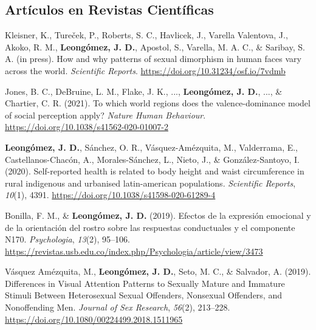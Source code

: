 \documentclass[11pt, a4paper]{awesome-cv}
\begin{document}
\endgroup

\hypertarget{artuxedculos-en-revistas-cientuxedficas}{%
\subsection{Artículos en Revistas
Científicas}\label{artuxedculos-en-revistas-cientuxedficas}}

\begingroup
\setlength{\parindent}{-0.5in}
\setlength{\leftskip}{0.5in}

\hypertarget{refs_journals}{}
\leavevmode\hypertarget{ref-Kleisner2021}{}%
Kleisner, K., Tureček, P., Roberts, S. C., Havlicek, J., Varella
Valentova, J., Akoko, R. M., \textbf{Leongómez, J. D.}, Apostol, S.,
Varella, M. A. C., \& Saribay, S. A. (in press). {How and why patterns
of sexual dimorphism in human faces vary across the world}.
\emph{Scientific Reports}. \url{https://doi.org/10.31234/osf.io/7vdmb}

\leavevmode\hypertarget{ref-Jones2021}{}%
Jones, B. C., DeBruine, L. M., Flake, J. K., ...,
\textbf{Leongómez, J. D.}, ..., \& Chartier, C. R. (2021). {To which
world regions does the valence-dominance model of social perception
apply?} \emph{Nature Human Behaviour}.
\url{https://doi.org/10.1038/s41562-020-01007-2}

\leavevmode\hypertarget{ref-Leonguxf3mez2020}{}%
\textbf{Leongómez, J. D.}, Sánchez, O. R., Vásquez-Amézquita, M.,
Valderrama, E., Castellanos-Chacón, A., Morales-Sánchez, L., Nieto, J.,
\& González-Santoyo, I. (2020). Self-reported health is related to body
height and waist circumference in rural indigenous and urbanised
latin-american populations. \emph{Scientific Reports}, \emph{10}(1),
4391. \url{https://doi.org/10.1038/s41598-020-61289-4}

\leavevmode\hypertarget{ref-BonillaCarreno2019}{}%
Bonilla, F. M., \& \textbf{Leongómez, J. D.} (2019). {Efectos de la
expresi{ó}n emocional y de la orientaci{ó}n del rostro sobre las
respuestas conductuales y el componente N170}. \emph{Psychologia},
\emph{13}(2), 95--106.
\url{https://revistas.usb.edu.co/index.php/Psychologia/article/view/3473}

\leavevmode\hypertarget{ref-VasquezAmezquita2019}{}%
Vásquez Amézquita, M., \textbf{Leongómez, J. D.}, Seto, M. C., \&
Salvador, A. (2019). {Differences in Visual Attention Patterns to
Sexually Mature and Immature Stimuli Between Heterosexual Sexual
Offenders, Nonsexual Offenders, and Nonoffending Men}. \emph{Journal of
Sex Research}, \emph{56}(2), 213--228.
\url{https://doi.org/10.1080/00224499.2018.1511965}
\end{document}
